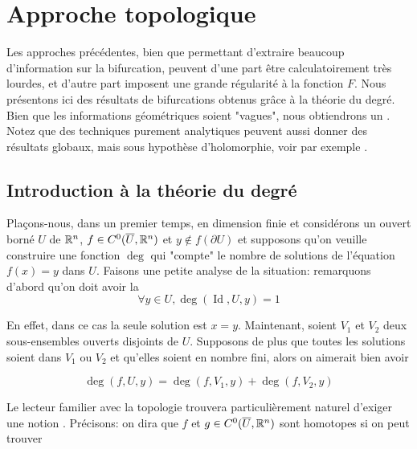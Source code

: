 \documentclass[memoire.tex]{subfiles}
\begin{document}
\section{Approche topologique}

Les approches précédentes, bien que permettant d'extraire beaucoup d'information sur la bifurcation, peuvent d'une part être calculatoirement très lourdes, et d'autre part imposent une grande régularité à la fonction $F$. Nous présentons ici des résultats de bifurcations obtenus grâce à la théorie du degré. Bien que les informations géométriques soient "vagues", nous obtiendrons un . Notez que des techniques purement analytiques peuvent aussi donner des résultats globaux, mais sous hypothèse d'holomorphie, voir par exemple \cite{BuffoniToland2003}.

\subsection{Introduction à la théorie du degré}

Plaçons-nous, dans un premier temps, en dimension finie et considérons un ouvert borné  $U$ de $\mathbb{R}^n$, $f\in C^0(\overline{U},\mathbb{R}^n)$ et $y\notin f(\partial U)$ et supposons qu'on veuille construire une fonction $\operatorname{deg}$ qui "compte" le nombre de solutions de l'équation $f(x)=y$ dans $U$. Faisons une petite analyse de la situation: remarquons d'abord qu'on doit avoir la 
\begin{equation*}
    \forall y\in U,\operatorname{deg}(\operatorname{Id},U,y)=1
\end{equation*}

En effet, dans ce cas la seule solution est $x=y$. Maintenant, soient $V_1$ et $V_2$ deux sous-ensembles ouverts disjoints de $U$. Supposons de plus que toutes les solutions soient dans $V_1$ ou $V_2$ et qu'elles soient en nombre fini, alors on aimerait bien avoir 

\begin{equation*}
    \operatorname{deg}(f,U,y)=\operatorname{deg}(f,V_1,y)+\operatorname{deg}(f,V_2,y)
\end{equation*}

Le lecteur familier avec la topologie trouvera particulièrement naturel d'exiger une notion . Précisons: on dira que $f$ et $g\in C^0(\overline{U},\mathbb{R}^n)$ sont homotopes si on peut trouver
\end{document}
